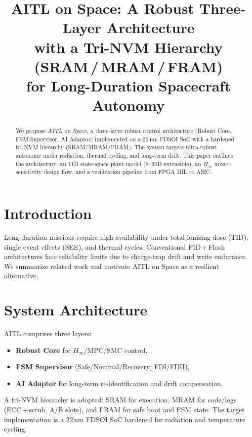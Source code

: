 \documentclass[conference]{IEEEtran}
\title{AITL on Space: A Robust Three-Layer Architecture\\
with a Tri-NVM Hierarchy (SRAM\,/\,MRAM\,/\,FRAM)\\
for Long-Duration Spacecraft Autonomy}
\author{\IEEEauthorblockN{Shinichi Samizo}
\IEEEauthorblockA{Independent Semiconductor Researcher\\
Former Engineer at Seiko Epson Corporation\\
Email: \texttt{shin3t72@gmail.com}\quad GitHub: \href{https://github.com/Samizo-AITL}{github.com/Samizo-AITL}}
}
\begin{document}
\maketitle

\begin{abstract}
We propose \emph{AITL on Space}, a three-layer robust control architecture (Robust Core, FSM Supervisor, AI Adaptor) implemented on a 22\,nm FDSOI SoC with a hardened tri-NVM hierarchy (SRAM/MRAM/FRAM). The system targets ultra-robust autonomy under radiation, thermal cycling, and long-term drift. This paper outlines the architecture, an 11D state-space plant model (8--20D extensible), an $H_\infty$ mixed-sensitivity design flow, and a verification pipeline from FPGA HIL to ASIC.
\end{abstract}

\section{Introduction}
Long-duration missions require high availability under total ionizing dose (TID), single event effects (SEE), and thermal cycles. Conventional PID\,+\,Flash architectures face reliability limits due to charge-trap drift and write endurance. We summarize related work and motivate AITL on Space as a resilient alternative.

\section{System Architecture}
AITL comprises three layers:
\begin{itemize}
\item \textbf{Robust Core} for $H_\infty$/MPC/SMC control,
\item \textbf{FSM Supervisor} (Safe/Nominal/Recovery; FDI/FDII),
\item \textbf{AI Adaptor} for long-term re-identification and drift compensation.
\end{itemize}
A tri-NVM hierarchy is adopted: SRAM for execution, MRAM for code/logs (ECC\,+\,scrub, A/B slots), and FRAM for safe boot and FSM state. The target implementation is a 22\,nm FDSOI SoC hardened for radiation and temperature cycling.
\end{document}
